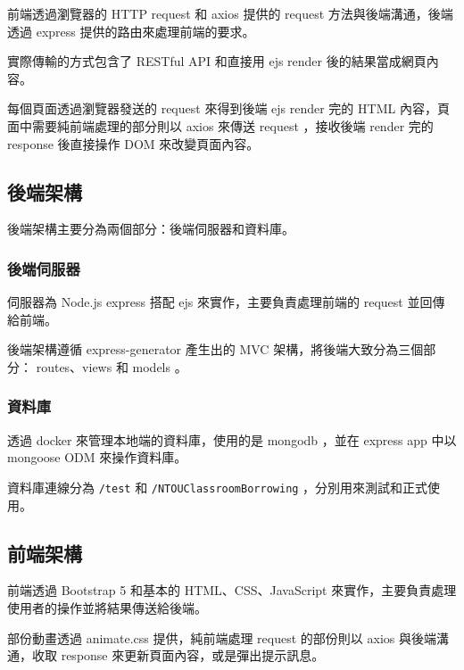 \documentclass{article}
\begin{document}
\begin{center}
	
\end{center}

\bigskip

前端透過瀏覽器的 HTTP request 和 axios 提供的 request 方法與後端溝通，後端透過 express 提供的路由來處理前端的要求。

實際傳輸的方式包含了 RESTful API 和直接用 ejs render 後的結果當成網頁內容。

每個頁面透過瀏覽器發送的 request 來得到後端 ejs render 完的 HTML 內容，頁面中需要純前端處理的部分則以 axios 來傳送 request ，接收後端 render 完的 response 後直接操作 DOM 來改變頁面內容。

\subsection{後端架構}

後端架構主要分為兩個部分：後端伺服器和資料庫。

\subsubsection{後端伺服器}

伺服器為 Node.js express 搭配 ejs 來實作，主要負責處理前端的 request 並回傳給前端。

後端架構遵循 express-generator 產生出的 MVC 架構，將後端大致分為三個部分： routes、views 和 models 。

\subsubsection{資料庫}

透過 docker 來管理本地端的資料庫，使用的是 mongodb ，並在 express app 中以 mongoose ODM 來操作資料庫。

資料庫連線分為 \verb|/test| 和 \verb|/NTOUClassroomBorrowing| ，分別用來測試和正式使用。

\subsection{前端架構}

前端透過 Bootstrap 5 和基本的 HTML、CSS、JavaScript 來實作，主要負責處理使用者的操作並將結果傳送給後端。

部份動畫透過 animate.css 提供，純前端處理 request 的部份則以 axios 與後端溝通，收取 response 來更新頁面內容，或是彈出提示訊息。
\end{document}
